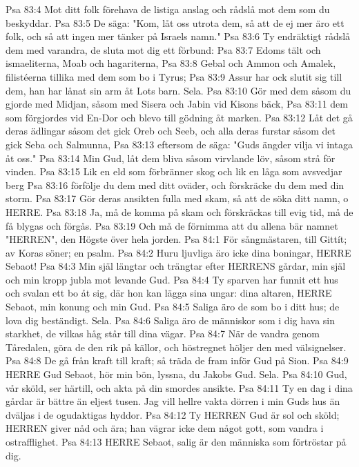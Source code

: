 Psa 83:4  Mot ditt folk förehava de listiga anslag och rådslå mot dem som du beskyddar.
Psa 83:5  De säga: "Kom, låt oss utrota dem, så att de ej mer äro ett folk, och så att ingen mer tänker på Israels namn."
Psa 83:6  Ty endräktigt rådslå dem med varandra, de sluta mot dig ett förbund:
Psa 83:7  Edoms tält och ismaeliterna, Moab och hagariterna,
Psa 83:8  Gebal och Ammon och Amalek, filistéerna tillika med dem som bo i Tyrus;
Psa 83:9  Assur har ock slutit sig till dem, han har lånat sin arm åt Lots barn. Sela.
Psa 83:10  Gör med dem såsom du gjorde med Midjan, såsom med Sisera och Jabin vid Kisons bäck,
Psa 83:11  dem som förgjordes vid En-Dor och blevo till gödning åt marken.
Psa 83:12  Låt det gå deras ädlingar såsom det gick Oreb och Seeb, och alla deras furstar såsom det gick Seba och Salmunna,
Psa 83:13  eftersom de säga: "Guds ängder vilja vi intaga åt oss."
Psa 83:14  Min Gud, låt dem bliva såsom virvlande löv, såsom strå för vinden.
Psa 83:15  Lik en eld som förbränner skog och lik en låga som avsvedjar berg
Psa 83:16  förfölje du dem med ditt oväder, och förskräcke du dem med din storm.
Psa 83:17  Gör deras ansikten fulla med skam, så att de söka ditt namn, o HERRE.
Psa 83:18  Ja, må de komma på skam och förskräckas till evig tid, må de få blygas och förgås.
Psa 83:19  Och må de förnimma att du allena bär namnet "HERREN", den Högste över hela jorden.
Psa 84:1  För sångmästaren, till Gittít; av Koras söner; en psalm.
Psa 84:2  Huru ljuvliga äro icke dina boningar, HERRE Sebaot!
Psa 84:3  Min själ längtar och trängtar efter HERRENS gårdar, min själ och min kropp jubla mot levande Gud.
Psa 84:4  Ty sparven har funnit ett hus och svalan ett bo åt sig, där hon kan lägga sina ungar: dina altaren, HERRE Sebaot, min konung och min Gud.
Psa 84:5  Saliga äro de som bo i ditt hus; de lova dig beständigt. Sela.
Psa 84:6  Saliga äro de människor som i dig hava sin starkhet, de vilkas håg står till dina vägar.
Psa 84:7  När de vandra genom Tåredalen, göra de den rik på källor, och höstregnet höljer den med välsignelser.
Psa 84:8  De gå från kraft till kraft; så träda de fram inför Gud på Sion.
Psa 84:9  HERRE Gud Sebaot, hör min bön, lyssna, du Jakobs Gud. Sela.
Psa 84:10  Gud, vår sköld, ser härtill, och akta på din smordes ansikte.
Psa 84:11  Ty en dag i dina gårdar är bättre än eljest tusen. Jag vill hellre vakta dörren i min Guds hus än dväljas i de ogudaktigas hyddor.
Psa 84:12  Ty HERREN Gud är sol och sköld; HERREN giver nåd och ära; han vägrar icke dem något gott, som vandra i ostrafflighet.
Psa 84:13  HERRE Sebaot, salig är den människa som förtröstar på dig.
